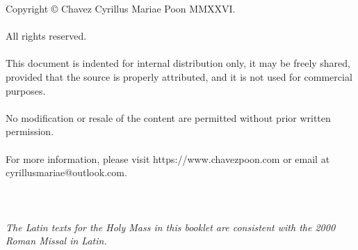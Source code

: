 \documentclass[12pt, a4paper]{article}
\begin{document}
	\newpage
	
	\mbox{}
	\vfill
	\noindent Copyright © Chavez Cyrillus Mariae Poon MMXXVI.
	\\\\
	All rights reserved.
	\\\\
	This document is indented for internal distribution only, it may be freely shared, provided that
	the source is properly attributed, and it is not used for commercial purposes.
	\\\\
	No modification or resale of the content are permitted without prior written permission.
	\\\\
	For more information, please visit https://www.chavezpoon.com or email at \\cyrillusmariae@outlook.com.
	\\\\
	\\\\
	\textit{The Latin texts for the Holy Mass in this booklet are consistent with the 2000 Roman Missal in Latin.}
	\newpage
\end{document}
